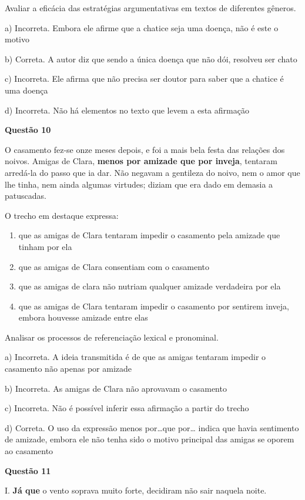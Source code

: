 Avaliar a eficácia das estratégias argumentativas em textos de
diferentes gêneros.

a) Incorreta. Embora ele afirme que a chatice seja uma doença, não é
este o motivo

b) Correta. A autor diz que sendo a única doença que não dói, resolveu
ser chato

c) Incorreta. Ele afirma que não precisa ser doutor para saber que a
chatice é uma doença

d) Incorreta. Não há elementos no texto que levem a esta afirmação

\textbf{Questão 10}

O casamento fez-se onze meses depois, e foi a mais bela festa das
relações dos noivos. Amigas de Clara, \textbf{menos por amizade que por
inveja}, tentaram arredá-la do passo que ia dar. Não negavam a gentileza
do noivo, nem o amor que lhe tinha, nem ainda algumas virtudes; diziam
que era dado em demasia a patuscadas.

O trecho em destaque expressa:

\begin{enumerate}
\def\labelenumi{\alph{enumi})}
\item
  que as amigas de Clara tentaram impedir o casamento pela amizade que
  tinham por ela
\item
  que as amigas de Clara consentiam com o casamento
\item
  que as amigas de clara não nutriam qualquer amizade verdadeira por ela
\item
  que as amigas de Clara tentaram impedir o casamento por sentirem
  inveja, embora houvesse amizade entre elas
\end{enumerate}

Analisar os processos de referenciação lexical e pronominal.

a) Incorreta. A ideia transmitida é de que as amigas tentaram impedir o
casamento não apenas por amizade

b) Incorreta. As amigas de Clara não aprovavam o casamento

c) Incorreta. Não é possível inferir essa afirmação a partir do trecho

d) Correta. O uso da expressão menos por\ldots que por\ldots{} indica
que havia sentimento de amizade, embora ele não tenha sido o motivo
principal das amigas se oporem ao casamento

\textbf{Questão 11}

I. \textbf{Já que} o vento soprava muito forte, decidiram não sair
naquela noite.

